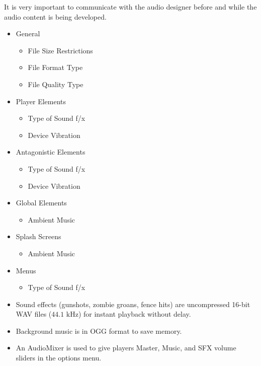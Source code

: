 \begin{guidance}
It is very important to communicate with the audio designer before and while the audio content is being developed.

\begin{itemize}[label=\textbullet]
  \item General
  \begin{itemize}[label=$\circ$]
    \item File Size Restrictions
    \item File Format Type
    \item File Quality Type
  \end{itemize}
  \item Player Elements
  \begin{itemize}[label=$\circ$]
    \item Type of Sound f/x
    \item Device Vibration
  \end{itemize}
  \item Antagonistic Elements
  \begin{itemize}[label=$\circ$]
    \item Type of Sound f/x
    \item Device Vibration
  \end{itemize}
  \item Global Elements
  \begin{itemize}[label=$\circ$]
    \item Ambient Music
  \end{itemize}
  \item Splash Screens
  \begin{itemize}[label=$\circ$]
    \item Ambient Music
  \end{itemize}
  \item Menus
  \begin{itemize}[label=$\circ$]
    \item Type of Sound f/x
  \end{itemize}
\end{itemize}
\end{guidance}
\begin{itemize}[label=\textbullet]
  \item Sound effects (gunshots, zombie groans, fence hits) are uncompressed 16-bit WAV files ($44.1\text{ kHz}$) for instant playback without delay.
  \item Background music is in OGG format to save memory.
  \item An AudioMixer is used to give players Master, Music, and SFX volume sliders in the options menu.
\end{itemize}

